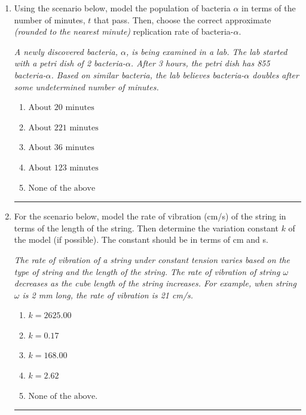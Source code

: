 \documentclass[14pt]{extbook}
\newcommand{\litem}[1]{\item#1\hspace*{-1cm}\rule{\textwidth}{0.4pt}}
\begin{document}
\begin{enumerate}
{\begin{enumerate}[label=\Alph*.]
\end{enumerate} }
\litem{
Using the scenario below, model the population of bacteria $\alpha$ in terms of the number of minutes, $t$ that pass. Then, choose the correct approximate \textit{(rounded to the nearest minute)} replication rate of bacteria-$\alpha$.
\begin{center}
    \textit{ A newly discovered bacteria, $\alpha$, is being examined in a lab. The lab started with a petri dish of 2 bacteria-$\alpha$. After 3 hours, the petri dish has 855 bacteria-$\alpha$. Based on similar bacteria, the lab believes bacteria-$\alpha$ doubles after some undetermined number of minutes. }
\end{center}
\begin{enumerate}[label=\Alph*.]
\item \( \text{About } 20 \text{ minutes} \)
\item \( \text{About } 221 \text{ minutes} \)
\item \( \text{About } 36 \text{ minutes} \)
\item \( \text{About } 123 \text{ minutes} \)
\item \( \text{None of the above} \)

\end{enumerate} }
\litem{
For the scenario below, model the rate of vibration (cm/s) of the string in terms of the length of the string. Then determine the variation constant $k$ of the model (if possible). The constant should be in terms of cm and s.
\begin{center}
    \textit{ The rate of vibration of a string under constant tension varies based on the type of string and the length of the string. The rate of vibration of string $\omega$ decreases as the cube length of the string increases. For example, when string $\omega$ is 2 mm long, the rate of vibration is 21 cm/s. }
\end{center}
\begin{enumerate}[label=\Alph*.]
\item \( k = 2625.00 \)
\item \( k = 0.17 \)
\item \( k = 168.00 \)
\item \( k = 2.62 \)
\item \( \text{None of the above.} \)


\end{enumerate}}
\end{enumerate}
\end{document}
